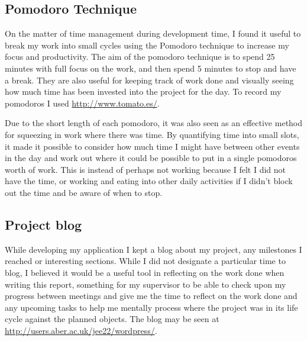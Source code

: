 \subsection{Pomodoro Technique}
On the matter of time management during development time, I found it useful to break my work into small cycles using the Pomodoro technique\cite{citeulike:14021988} to increase my focus and productivity. The aim of the pomodoro technique is to spend 25 minutes with full focus on the work, and then spend 5 minutes to stop and have a break. They are also useful for keeping track of work done and visually seeing how much time has been invested into the project for the day. To record my pomodoros I used \url{http://www.tomato.es/}.
 
Due to the short length of each pomodoro, it was also seen as an effective method for squeezing in work where there was time. By quantifying time into small slots, it made it possible to consider how much time I might have between other events in the day and work out where it could be possible to put in a single pomodoros worth of work. This is instead of perhaps not working because I felt I did not have the time, or working and eating into other daily activities if I didn't block out the time and be aware of when to stop.

\subsection{Project blog}
While developing my application I kept a blog about my project, any milestones I reached or interesting sections. While I did not designate a particular time to blog, I believed it would be a useful tool in reflecting on the work done when writing this report, something for my supervisor to be able to check upon my progress between meetings and give me the time to reflect on the work done and any upcoming tasks to help me mentally process where the project was in its life cycle against the planned objects. The blog may be seen at \url{http://users.aber.ac.uk/jee22/wordpress/}.
